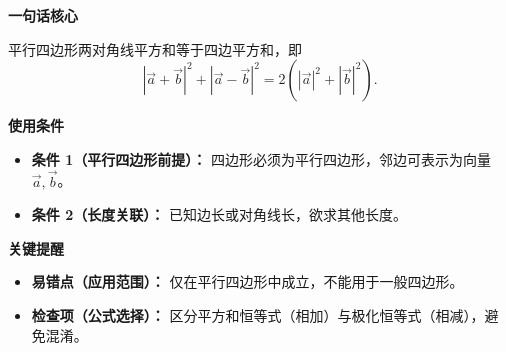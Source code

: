 \begin{summarybox}
	\textbf{\textcolor{CSummary}{一句话核心}}

	平行四边形两对角线平方和等于四边平方和，即
	\[
		|\vec{a}+\vec{b}|^2 + |\vec{a}-\vec{b}|^2 = 2(|\vec{a}|^2 + |\vec{b}|^2).
	\]

	\medskip
	\textbf{\textcolor{CSummary}{使用条件}}
	\begin{itemize}[leftmargin=*, itemsep=0.5em, topsep=0.4em]
		\item \textbf{条件 1（平行四边形前提）：} 四边形必须为平行四边形，邻边可表示为向量 $\vec{a},\vec{b}$。
		\item \textbf{条件 2（长度关联）：} 已知边长或对角线长，欲求其他长度。
	\end{itemize}

	\medskip
	\textbf{\textcolor{CSummary}{关键提醒}}
	\begin{itemize}[leftmargin=*, itemsep=0.5em, topsep=0.4em]
		\item \textbf{易错点（应用范围）：} 仅在平行四边形中成立，不能用于一般四边形。
		\item \textbf{检查项（公式选择）：} 区分平方和恒等式（相加）与极化恒等式（相减），避免混淆。
	\end{itemize}
\end{summarybox}
